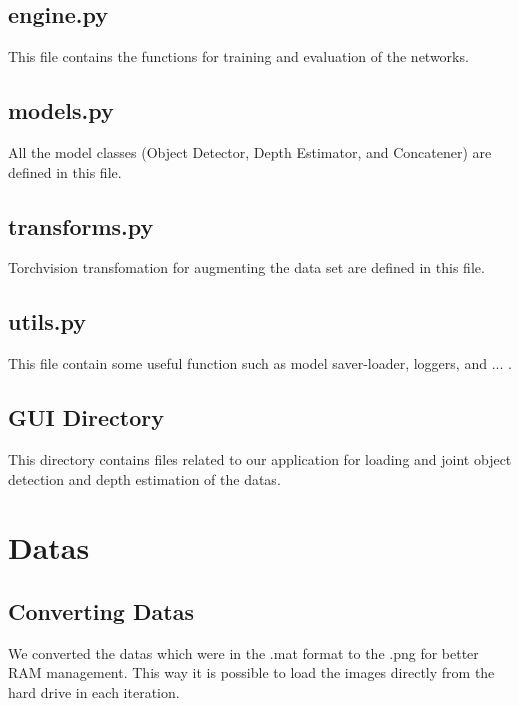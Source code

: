\documentclass[a4paper, openany]{book}
\begin{document}
\subsection{engine.py}
	\vspace{0.3cm}
	
This file contains the functions for training and evaluation of the networks.

\subsection{models.py}
	\vspace{0.3cm}	
	
All the model classes (Object Detector, Depth Estimator, and Concatener) are defined in this file.
	
\subsection{transforms.py}
	\vspace{0.3cm}	
	
Torchvision transfomation for augmenting the data set are defined in this file.
	
\subsection{utils.py}
	\vspace{0.3cm}	
	
This file contain some useful function such as model saver-loader, loggers, and ... .

\subsection{GUI Directory}
	\vspace{0.3cm}	

This directory contains files related to our application for loading and joint object detection and depth estimation of the datas.






	\newpage
	
\section{Datas}
	\vspace{0.3cm}
\subsection{Converting Datas}
	\vspace{0.3cm}
We converted the datas which were in the .mat format to the .png  for better RAM management. This way it is possible to load the images directly from the hard drive in each iteration.
\end{document}
